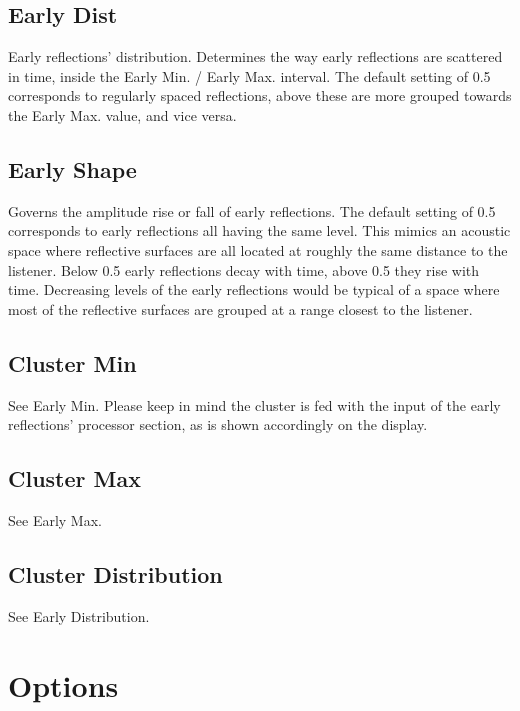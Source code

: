 \documentclass[
  letterpaper,
  DIV=11,
  numbers=noendperiod]{scrreport}
\begin{document}
\hypertarget{early-dist}{%
\subsection{Early Dist}\label{early-dist}}

Early reflections' distribution. Determines the way early reflections
are scattered in time, inside the Early Min. / Early Max. interval. The
default setting of 0.5 corresponds to regularly spaced reflections,
above these are more grouped towards the Early Max. value, and vice
versa.

\hypertarget{early-shape}{%
\subsection{Early Shape}\label{early-shape}}

Governs the amplitude rise or fall of early reflections. The default
setting of 0.5 corresponds to early reflections all having the same
level. This mimics an acoustic space where reflective surfaces are all
located at roughly the same distance to the listener. Below 0.5 early
reflections decay with time, above 0.5 they rise with time. Decreasing
levels of the early reflections would be typical of a space where most
of the reflective surfaces are grouped at a range closest to the
listener.

\hypertarget{cluster-min}{%
\subsection{Cluster Min}\label{cluster-min}}

See Early Min. Please keep in mind the cluster is fed with the input of
the early reflections' processor section, as is shown accordingly on the
display.

\hypertarget{cluster-max}{%
\subsection{Cluster Max}\label{cluster-max}}

See Early Max.

\hypertarget{cluster-distribution}{%
\subsection{Cluster Distribution}\label{cluster-distribution}}

See Early Distribution.

\hypertarget{options-1}{%
\section{Options}\label{options-1}}
\end{document}
